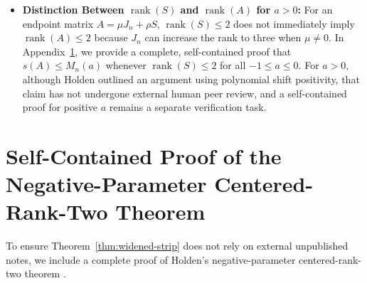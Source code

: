 \documentclass[11pt,reqno]{article}
\theoremstyle{definition}
\newcommand{\one}{\mathbf{1}}
\newcommand{\rank}{\operatorname{rank}}
\begin{document}
\begin{itemize}
    Numerical multi-start optimization across every dimension $n \in \{3, 4, 5, \dots, 16\}$ (with 40 independent random initializations per dimension, optimizing $z \in S^{n-1} \cap \one^\perp$ across discrete candidate graphs $H$) is fully consistent with Conjecture~\ref{conj:spherical-c1}, recovering the conjectured bound to within numerical tolerance ($< 10^{-11}$). Furthermore, by Theorem~\ref{thm:universal-tied-elim}, the infinite family $H^\star_{n, k} = J_k \oplus J_k \oplus 0_{n-2k}$ attains the exact same first-order value on the sphere via the sparse two-level eigenvector $z = \frac{1}{\sqrt{2k}}(\one_k^T, -\one_k^T, \mathbf{0}_{n-2k}^T)^T$, while being strictly defeated by $B_{n, k}$ at second order ($\frac{2k^4}{n^3}(1-a)^2$). Settling Conjecture~\ref{conj:spherical-c1} analytically and classifying all first-order maximizers represents a promising dimension-free pathway toward proving the Fallat-Xing conjecture near $a = 1$.
    \item \textbf{Distinction Between $\rank(S)$ and $\rank(A)$ for $a > 0$:} For an endpoint matrix $A = \mu J_n + \rho S$, $\rank(S) \le 2$ does not immediately imply $\rank(A) \le 2$ because $J_n$ can increase the rank to three when $\mu \ne 0$. In Appendix~\ref{app:centered-rank2}, we provide a complete, self-contained proof that $s(A) \le M_n(a)$ whenever $\rank(S) \le 2$ for all $-1 \le a \le 0$. For $a > 0$, although Holden \cite{holden2026b} outlined an argument using polynomial shift positivity, that claim has not undergone external human peer review, and a self-contained proof for positive $a$ remains a separate verification task.
\end{itemize}

\appendix

\section{Self-Contained Proof of the Negative-Parameter Centered-Rank-Two Theorem}\label{app:centered-rank2}

To ensure Theorem~\ref{thm:widened-strip} does not rely on external unpublished notes, we include a complete proof of Holden's negative-parameter centered-rank-two theorem \cite{holden2026b}.
\end{document}
